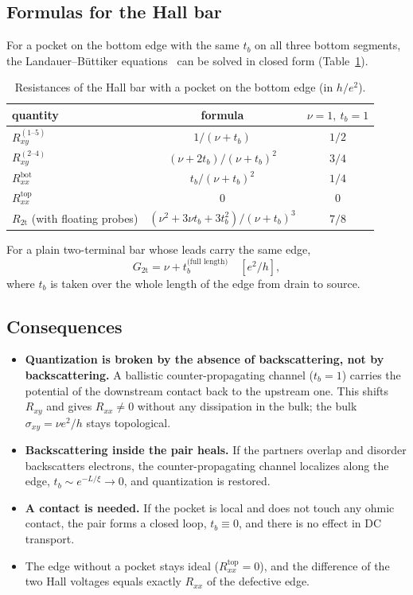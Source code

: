 \documentclass[11pt,a4paper]{article}
\newcommand{\tb}{t_b}
\newcommand{\he}{h/e^2}
\newcommand{\Rxy}{R_{xy}}
\newcommand{\Rxx}{R_{xx}}
\newcommand{\botm}{\text{bot}}
\newcommand{\topp}{\text{top}}
\begin{document}
\subsection{Formulas for the Hall bar}
For a pocket on the bottom edge with the same $\tb$ on all three bottom
segments, the Landauer--Büttiker equations~\cite{buttiker} can be solved in
closed form (Table~\ref{tab:lb}).

\begin{table}[ht]
\centering
\caption{Resistances of the Hall bar with a pocket on the bottom edge (in
$\he$).}
\label{tab:lb}
\begin{tabular}{lcc}
\toprule
quantity & formula & $\nu=1,\ \tb=1$\\
\midrule
$\Rxy^{(1\text{--}5)}$ & $1/(\nu+\tb)$ & $1/2$\\
$\Rxy^{(2\text{--}4)}$ & $(\nu+2\tb)/(\nu+\tb)^2$ & $3/4$\\
$\Rxx^\botm$ & $\tb/(\nu+\tb)^2$ & $1/4$\\
$\Rxx^\topp$ & $0$ & $0$\\
$R_\text{2t}$ (with floating probes) & $(\nu^2+3\nu\tb+3\tb^2)/(\nu+\tb)^3$ & $7/8$\\
\bottomrule
\end{tabular}
\end{table}

For a plain two-terminal bar whose leads carry the same edge,
\begin{equation}\label{eq:g2t}
G_\text{2t}=\nu+\tb^{\text{(full length)}}\quad[e^2/h],
\end{equation}
where $\tb$ is taken over the whole length of the edge from drain to source.

\subsection{Consequences}
\begin{itemize}
\item \textbf{Quantization is broken by the absence of backscattering, not
  by backscattering.} A ballistic counter-propagating channel ($\tb=1$)
  carries the potential of the downstream contact back to the upstream one.
  This shifts $\Rxy$ and gives $\Rxx\neq0$ without any dissipation in the
  bulk; the bulk $\sigma_{xy}=\nu e^2/h$ stays topological.
\item \textbf{Backscattering inside the pair heals.} If the partners
  overlap and disorder backscatters electrons, the counter-propagating
  channel localizes along the edge, $\tb\sim e^{-L/\xi}\to0$, and
  quantization is restored.
\item \textbf{A contact is needed.} If the pocket is local and does not
  touch any ohmic contact, the pair forms a closed loop, $\tb\equiv0$, and
  there is no effect in DC transport.
\item The edge without a pocket stays ideal ($\Rxx^\topp=0$), and the
  difference of the two Hall voltages equals exactly $\Rxx$ of the
  defective edge.
\end{itemize}
\end{document}
